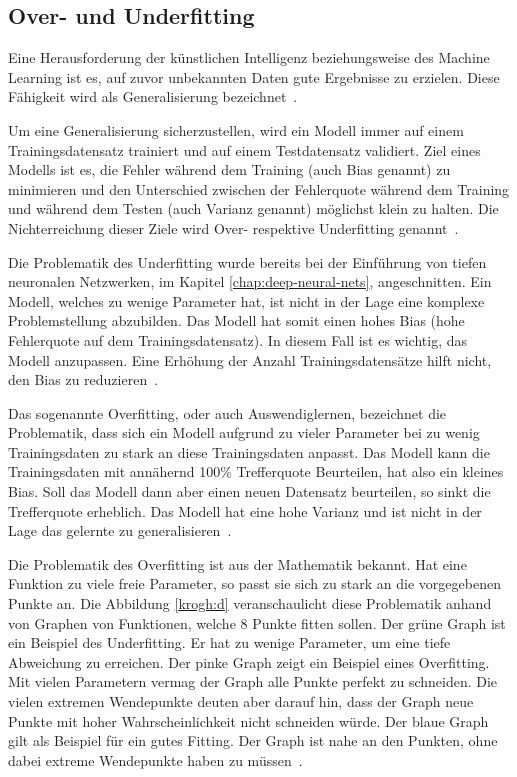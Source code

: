\subsection{Over- und Underfitting}
\label{chap:overfitting}

Eine Herausforderung der künstlichen Intelligenz beziehungsweise des Machine Learning ist es, auf zuvor unbekannten Daten gute Ergebnisse zu erzielen. Diese Fähigkeit wird als Generalisierung bezeichnet~\autocite{Goodfellow2016}.

Um eine Generalisierung sicherzustellen, wird ein Modell immer auf einem Trainingsdatensatz trainiert und auf einem Testdatensatz validiert. Ziel eines Modells ist es, die Fehler während dem Training (auch Bias genannt) zu minimieren und den Unterschied zwischen der Fehlerquote während dem Training und während dem Testen (auch Varianz genannt) möglichst klein zu halten. Die Nichterreichung dieser Ziele wird Over- respektive Underfitting genannt~\autocite{Goodfellow2016}.

Die Problematik des Underfitting wurde bereits bei der Einführung von tiefen neuronalen Netzwerken, im Kapitel \ref{chap:deep-neural-nets}, angeschnitten. Ein Modell, welches zu wenige Parameter hat, ist nicht in der Lage eine komplexe Problemstellung abzubilden. Das Modell hat somit einen hohes Bias (hohe Fehlerquote auf dem Trainingsdatensatz). In diesem Fall ist es wichtig, das Modell anzupassen. Eine Erhöhung der Anzahl Trainingsdatensätze hilft nicht, den Bias zu reduzieren~\autocite{MLYearning}.

Das sogenannte Overfitting, oder auch Auswendiglernen, bezeichnet die Problematik, dass sich ein Modell aufgrund zu vieler Parameter bei zu wenig Trainingsdaten zu stark an diese Trainingsdaten anpasst. Das Modell kann die Trainingsdaten mit annähernd 100\% Trefferquote Beurteilen, hat also ein kleines Bias. Soll das Modell dann aber einen neuen Datensatz beurteilen, so sinkt die Trefferquote erheblich. Das Modell hat eine hohe Varianz und ist nicht in der Lage das gelernte zu generalisieren~\autocite{MLYearning, Krogh2008}.

Die Problematik des Overfitting ist aus der Mathematik bekannt. Hat eine Funktion zu viele freie Parameter, so passt sie sich zu stark an die vorgegebenen Punkte an. Die Abbildung \ref{krogh:d} veranschaulicht diese Problematik anhand von Graphen von Funktionen, welche 8 Punkte fitten sollen. Der grüne Graph ist ein Beispiel des Underfitting. Er hat zu wenige Parameter, um eine tiefe Abweichung zu erreichen. Der pinke Graph zeigt ein Beispiel eines Overfitting. Mit vielen Parametern vermag der Graph alle Punkte perfekt zu schneiden. Die vielen extremen Wendepunkte deuten aber darauf hin, dass der Graph neue Punkte mit hoher Wahrscheinlichkeit nicht schneiden würde. Der blaue Graph gilt als Beispiel für ein gutes Fitting. Der Graph ist nahe an den Punkten, ohne dabei extreme Wendepunkte haben zu müssen~\autocite{Krogh2008}.

